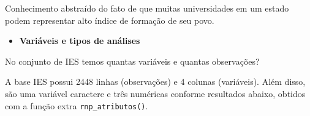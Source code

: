 \documentclass[12pt,]{style/krantz}
\makeatletter
\newenvironment{Shaded}{\begin{snugshade}}{\end{snugshade}}
\newcommand{\CommentTok}[1]{\textcolor[rgb]{0.56,0.35,0.01}{\textit{#1}}}
\newcommand{\DataTypeTok}[1]{\textcolor[rgb]{0.13,0.29,0.53}{#1}}
\newcommand{\DecValTok}[1]{\textcolor[rgb]{0.00,0.00,0.81}{#1}}
\newcommand{\KeywordTok}[1]{\textcolor[rgb]{0.13,0.29,0.53}{\textbf{#1}}}
\newcommand{\NormalTok}[1]{#1}
\newcommand{\OperatorTok}[1]{\textcolor[rgb]{0.81,0.36,0.00}{\textbf{#1}}}
\newcommand{\OtherTok}[1]{\textcolor[rgb]{0.56,0.35,0.01}{#1}}
\newcommand{\StringTok}[1]{\textcolor[rgb]{0.31,0.60,0.02}{#1}}
\providecommand{\tightlist}{%
  \setlength{\itemsep}{0pt}\setlength{\parskip}{0pt}}
\newenvironment{kframe}{%
\medskip{}
\setlength{\fboxsep}{.8em}
 \def\at@end@of@kframe{}%
 \ifinner\ifhmode%
  \def\at@end@of@kframe{\end{minipage}}%
  \begin{minipage}{\columnwidth}%
 \fi\fi%
 \def\FrameCommand##1{\hskip\@totalleftmargin \hskip-\fboxsep
 \colorbox{shadecolor}{##1}\hskip-\fboxsep
     \hskip-\linewidth \hskip-\@totalleftmargin \hskip\columnwidth}%
 \MakeFramed {\advance\hsize-\width
   \@totalleftmargin\z@ \linewidth\hsize
   \@setminipage}}%
 {\par\unskip\endMakeFramed%
 \at@end@of@kframe}
\renewenvironment{Shaded}{\begin{kframe}}{\end{kframe}}
\theoremstyle{definition}
\theoremstyle{definition}
\theoremstyle{definition}
\theoremstyle{remark}
\let\BeginKnitrBlock\begin \let\EndKnitrBlock\end
\makeatother
\begin{document}
\BeginKnitrBlock{solution}
\iffalse{} {Solução. } \fi{}Conhecimento abstraído do fato de que muitas universidades em um estado podem representar alto índice de formação de seu povo.
\EndKnitrBlock{solution}

\begin{itemize}
\tightlist
\item
  \textbf{Variáveis e tipos de análises}
\end{itemize}

\BeginKnitrBlock{exercise}
\protect\hypertarget{exr:unnamed-chunk-22}{}{\label{exr:unnamed-chunk-22} }No conjunto de IES temos quantas variáveis e quantas observações?
\EndKnitrBlock{exercise}

\BeginKnitrBlock{solution}
\iffalse{} {Solução. } \fi{}A base IES possui 2448 linhas (observações) e 4 colunas (variáveis). Além disso, são uma variável caractere e três numéricas conforme resultados abaixo, obtidos com a função extra \texttt{rnp\_atributos()}.
\EndKnitrBlock{solution}

\begin{Shaded}
\end{Shaded}
\end{document}
